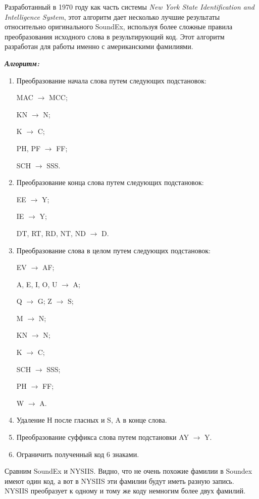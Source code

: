 \documentclass[titlepage,12pt]{article}
\begin{document}
Разработанный в 1970 году как часть системы \textit{New York State Identification and Intelligence System}, этот алгоритм дает несколько лучшие результаты относительно оригинального SoundEx, используя более сложные правила преобразования исходного слова в результирующий код. Этот алгоритм разработан для работы именно с американскими фамилиями.

\textit{\textbf{Алгоритм:}}
\begin{enumerate}
    \item Преобразование начала слова путем следующих подстановок: 
    
    MAC $\rightarrow$ MCC; 
    
    KN $\rightarrow$ N; 
    
    K $\rightarrow$ C;
    
    PH, PF $\rightarrow$ FF; 
    
    SCH $\rightarrow$ SSS.
    \item Преобразование конца слова путем следующих подстановок: 
    
    EE $\rightarrow$ Y; 
    
    IE $\rightarrow$ Y; 
    
    DT, RT, RD, NT, ND $\rightarrow$ D.
    \item Преобразование слова в целом путем следующих
подстановок: 
    
    EV $\rightarrow$ AF; 
    
    A, E, I, O, U $\rightarrow$ A; 
    
    Q $\rightarrow$ G; Z $\rightarrow$ S;
    
    M $\rightarrow$ N; 
    
    KN $\rightarrow$ N; 
    
    K $\rightarrow$ C; 
    
    SCH $\rightarrow$ SSS; 
    
    PH $\rightarrow$ FF;
    
    W $\rightarrow$ A.
    \item Удаление Н после гласных и S, A в конце слова.
    \item Преобразование суффикса слова путем подстановки AY $\rightarrow$ Y.
    \item Ограничить полученный код 6 знаками.
\end{enumerate}
Сравним SoundEx и NYSIIS. Видно, что не очень похожие фамилии в Soundex имеют один код, а вот в NYSIIS эти фамилии будут иметь разную запись. NYSIIS преобразует к одному и тому же коду немногим более двух фамилий.
\end{document}
